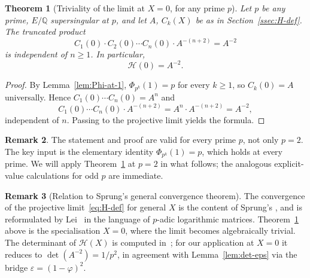 \documentclass[11pt,a4paper]{amsart}
\newtheorem{theorem}{Theorem}[section]
\theoremstyle{definition}
\newtheorem{remark}[theorem]{Remark}
\newcommand{\Q}{\mathbb{Q}}
\newcommand{\eps}{\varepsilon}
\newcommand{\Hcal}{\mathcal{H}}
\begin{document}
\begin{theorem}[Triviality of the limit at $X=0$, for any prime $p$]\label{thm:trivial-limit}
Let $p$ be any prime, $E/\Q$ supersingular at $p$, and let $A$, $C_k(X)$ be as in Section~\ref{ssec:H-def}. The truncated product
\[
C_1(0) \cdot C_2(0) \cdots C_n(0) \cdot A^{-(n+2)} = A^{-2}
\]
is independent of $n \geq 1$. In particular,
\begin{equation}\label{eq:H-at-zero}
\Hcal(0) = A^{-2}.
\end{equation}
\end{theorem}

\begin{proof}
By Lemma~\ref{lem:Phi-at-1}, $\Phi_{p^k}(1) = p$ for every $k \geq 1$, so $C_k(0) = A$ universally. Hence $C_1(0) \cdots C_n(0) = A^n$ and
\[
C_1(0) \cdots C_n(0) \cdot A^{-(n+2)} = A^n \cdot A^{-(n+2)} = A^{-2},
\]
independent of $n$. Passing to the projective limit yields the formula.
\end{proof}

\begin{remark}
The statement and proof are valid for every prime $p$, not only $p = 2$. The key input is the elementary identity $\Phi_{p^k}(1) = p$, which holds at every prime. We will apply Theorem~\ref{thm:trivial-limit} at $p = 2$ in what follows; the analogous explicit-value calculations for odd $p$ are immediate.
\end{remark}

\begin{remark}[Relation to Sprung's general convergence theorem]\label{rem:lei-relation}
The convergence of the projective limit~\eqref{eq:H-def} for general $X$ is the content of Sprung's \cite[Lemma~4.4 (Convergence Lemma) and Lemma~4.8 (Growth Lemma)]{Sprung2012}, and is reformulated by Lei~\cite[Theorem~1.5]{Lei2013} in the language of $p$-adic logarithmic matrices. Theorem~\ref{thm:trivial-limit} above is the specialisation $X = 0$, where the limit becomes algebraically trivial. The determinant of $\Hcal(X)$ is computed in~\cite[Example~4.7]{Sprung2012}; for our application at $X = 0$ it reduces to $\det(A^{-2}) = 1/p^2$, in agreement with Lemma~\ref{lem:det-eps} via the bridge $\eps = (1-\varphi)^2$.
\end{remark}
\end{document}
